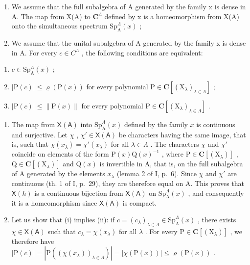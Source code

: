 \begin{enumerate}
\def\labelenumi{\alph{enumi})}
\item
  We assume that the full subalgebra of A generated by the family x is dense in A. The map from X(A) to \(\mathbf{C}^{\Lambda}\) defined by x is a homeomorphism from X(A) onto the simultaneous spectrum \(\mathrm{Sp}_{\mathrm{A}}^{\Lambda}(x)\) ;
\item
  We assume that the unital subalgebra of A generated by the family x is dense in A. For every \(c \in C^{\Lambda}\) , the following conditions are equivalent:
\end{enumerate}

\begin{enumerate}
\def\labelenumi{(\roman{enumi})}
\item
  \(c \in \mathrm{Sp}_{\mathrm{A}}^{\Lambda}(x)\) ;
\item
  \(|\mathrm{P}(c)| \leqslant \varrho(\mathrm{P}(x))\) for every polynomial \(\mathrm{P} \in \mathbf{C}[(\mathrm{X}_{\lambda})_{\lambda \in \Lambda}]\) ;
\item
  \(|\mathrm{P}(c)| \leqslant \| \mathrm{P}(x)\|\) for every polynomial \(\mathrm{P} \in \mathbf{C}[(\mathrm{X}_{\lambda})_{\lambda \in \Lambda}]\) .
\end{enumerate}

\begin{enumerate}
\def\labelenumi{\alph{enumi})}
\item
  The map from \(\mathsf{X}(\mathsf{A})\) into \(\mathrm{Sp}_{\mathrm{A}}^{\Lambda}(x)\) defined by the family \(x\) is continuous and surjective. Let \(\chi\) , \(\chi' \in \mathsf{X}(\mathsf{A})\) be characters having the same image, that is, such that \(\chi(x_{\lambda}) = \chi'(x_{\lambda})\) for all \(\lambda \in \Lambda\) . The characters \(\chi\) and \(\chi'\) coincide on elements of the form \(\mathrm{P}(x)\mathrm{Q}(x)^{-1}\) , where \(\mathrm{P} \in \mathbf{C}[(\mathrm{X}_{\lambda})]\) , \(\mathrm{Q} \in \mathbf{C}[(\mathrm{X}_{\lambda})]\) and \(\mathrm{Q}(x)\) is invertible in A, that is, on the full subalgebra of A generated by the elements \(x_{\lambda}\) (lemma 2 of I, p.~6). Since \(\chi\) and \(\chi'\) are continuous (th. 1 of I, p.~29), they are therefore equal on A. This proves that \(\mathsf{X}(h)\) is a continuous bijection from \(\mathsf{X}(\mathsf{A})\) on \(\mathrm{Sp}_{\mathrm{A}}^{\Lambda}(x)\) , and consequently it is a homeomorphism since \(\mathsf{X}(\mathsf{A})\) is compact.
\item
  Let us show that (i) implies (ii): if \(c = (c_{\lambda})_{\lambda \in \Lambda} \in \mathrm{Sp}_{\mathrm{A}}^{\Lambda}(x)\) , there exists \(\chi \in \mathsf{X}(\mathsf{A})\) such that \(c_{\lambda} = \chi(x_{\lambda})\) for all \(\lambda\) . For every \(\mathrm{P} \in \mathbf{C}[(\mathrm{X}_{\lambda})]\) , we therefore have \(|\mathrm{P}(c)| = |\mathrm{P}((\chi(x_{\lambda}))_{\lambda \in \Lambda})| = |\chi(\mathrm{P}(x))| \leqslant \varrho(\mathrm{P}(x))\) .
\end{enumerate}

